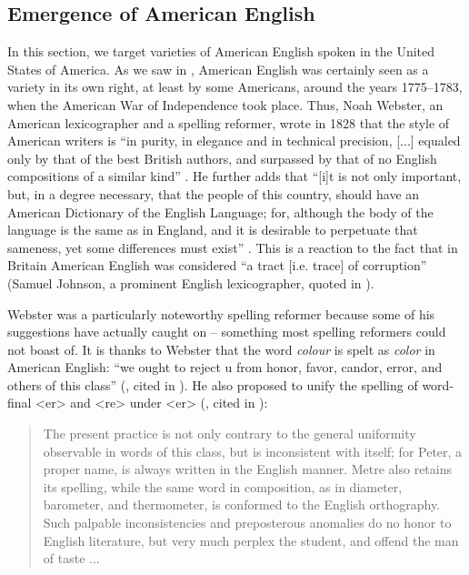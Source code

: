 \subsection{Emergence of American English}\label{LModE-AmE}
In this section, we target varieties of American English spoken in the United States of America. As we saw in , American English was certainly seen as a variety in its own right, at least by some Americans, around the years 1775--1783, when the American War of Independence took place. Thus, Noah Webster, an American lexicographer and a spelling reformer, wrote in 1828 that the style of American writers is ``in purity, in elegance and in technical precision, {[}...{]} equaled only by that of the best British authors, and surpassed by that of no English compositions of a similar kind'' \citep[viii]{Webster1828}. He further adds that ``{[}i{]}t is not only important, but, in a degree necessary, that the people of this country, should have an American Dictionary of the English Language; for, although the body of the language is the same as in England, and it is desirable to perpetuate that sameness, yet some differences must exist'' \citep[vi-vii]{Webster1828}. This is a reaction to the fact that in Britain American English was considered ``a tract {[}i.e. trace{]} of corruption'' (Samuel Johnson, a prominent English lexicographer, quoted in \citealp[4]{Martin2019}).

Webster was a particularly noteworthy spelling reformer because some of his suggestions have actually caught on -- something most spelling reformers could not boast of. It is thanks to Webster that the word \textit{colour} is spelt as \textit{color} in American English: ``we ought to reject u from honor, favor, candor, error, and others of this class'' (\citealp{Webster1806}, cited in \citealp[435]{ShapiroLynch2017}). He also proposed to unify the spelling of word-final <er> and <re> under <er> (\citealp{Webster1806}, cited in \citealp[434--435]{ShapiroLynch2017}):

\begin{quote}
    The present practice is not only contrary to the general uniformity observable in words of this class, but is inconsistent with itself; for Peter, a proper name, is always written in the English manner. Metre also retains its  spelling, while the same word in composition, as in diameter, barometer, and thermometer, is conformed to the English orthography. Such palpable inconsistencies and preposterous anomalies do no honor to English literature, but very much perplex the student, and offend the man of taste ...
\end{quote}

